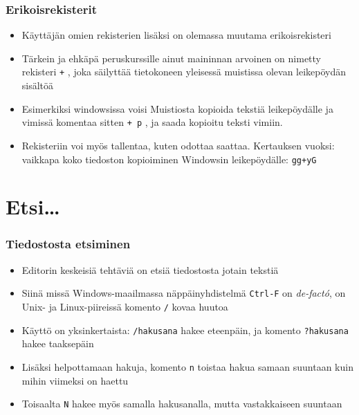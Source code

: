 \documentclass[]{beamer}
\newcommand{\Tohj}[1]{\texttt{#1}}
\newcommand{\com}[1]{{\color{blue!50!black}\Tohj{#1}} \!\!}
\begin{document}
\begin{frame}
    \frametitle{Erikoisrekisterit}
    \begin{itemize}
        \item Käyttäjän omien rekisterien lisäksi on olemassa muutama erikoisrekisteri
        \item Tärkein ja ehkäpä peruskurssille ainut maininnan arvoinen on nimetty rekisteri \com{\textquotedbl +}, joka säilyttää tietokoneen yleisessä muistissa olevan leikepöydän sisältöä
        \pause
        \item Esimerkiksi windowsissa voisi Muistiosta kopioida tekstiä leikepöydälle ja vimissä komentaa sitten \com{\textquotedbl + p}, ja saada kopioitu teksti vimiin.
        \item Rekisteriin voi myös tallentaa, kuten odottaa saattaa. Kertauksen vuoksi: vaikkapa koko tiedoston kopioiminen Windowsin leikepöydälle: \com{gg\textquotedbl+yG}
    \end{itemize}
\end{frame}

\section {Etsi\ldots}

\begin{frame}
    \frametitle{Tiedostosta etsiminen}
    \begin{itemize}
        \item Editorin keskeisiä tehtäviä on etsiä tiedostosta jotain tekstiä
        \item Siinä missä Windows-maailmassa näppäinyhdistelmä \com{Ctrl-F} on \emph{de-fact\'o}, on Unix- ja Linux-piireissä komento \com{/} kovaa huutoa
        \item Käyttö on yksinkertaista: \com{/{\color{blue}hakusana}} hakee eteenpäin, ja komento \com{?{\color{blue}hakusana}} hakee taaksepäin
        \pause
        \item Lisäksi helpottamaan hakuja, komento \com{n} toistaa hakua samaan suuntaan kuin mihin viimeksi on haettu
        \item Toisaalta \com{N} hakee myös samalla hakusanalla, mutta vastakkaiseen suuntaan
    \end{itemize}
\end{frame}
\end{document}
